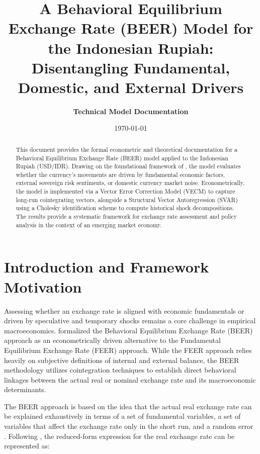 \documentclass[11pt,a4paper]{article}
\title{\textbf{A Behavioral Equilibrium Exchange Rate (BEER) Model for the Indonesian Rupiah: Disentangling Fundamental, Domestic, and External Drivers}}
\author{\textbf{Technical Model Documentation}}
\date{\today}
\begin{document}
\maketitle

\begin{abstract}
\noindent This document provides the formal econometric and theoretical documentation for a Behavioral Equilibrium Exchange Rate (BEER) model applied to the Indonesian Rupiah (USD/IDR). Drawing on the foundational framework of \cite{ClarkMacDonald1998}, the model evaluates whether the currency's movements are driven by fundamental economic factors, external sovereign risk sentiments, or domestic currency market noise. Econometrically, the model is implemented via a Vector Error Correction Model (VECM) to capture long-run cointegrating vectors, alongside a Structural Vector Autoregression (SVAR) using a Cholesky identification scheme to compute historical shock decompositions. The results provide a systematic framework for exchange rate assessment and policy analysis in the context of an emerging market economy.
\end{abstract}

\newpage
\tableofcontents
\newpage

\section{Introduction and Framework Motivation}

Assessing whether an exchange rate is aligned with economic fundamentals or driven by speculative and temporary shocks remains a core challenge in empirical macroeconomics. \cite{ClarkMacDonald1998} formalized the Behavioral Equilibrium Exchange Rate (BEER) approach as an econometrically driven alternative to the Fundamental Equilibrium Exchange Rate (FEER) approach. While the FEER approach relies heavily on subjective definitions of internal and external balance, the BEER methodology utilizes cointegration techniques to establish direct behavioral linkages between the actual real or nominal exchange rate and its macroeconomic determinants.

The BEER approach is based on the idea that the actual real exchange rate can be explained exhaustively in terms of a set of fundamental variables, a set of variables that affect the exchange rate only in the short run, and a random error \citep{ClarkMacDonald1998}. Following \cite{ClarkMacDonald1998}, the reduced-form expression for the real exchange rate can be represented as:
\end{document}
